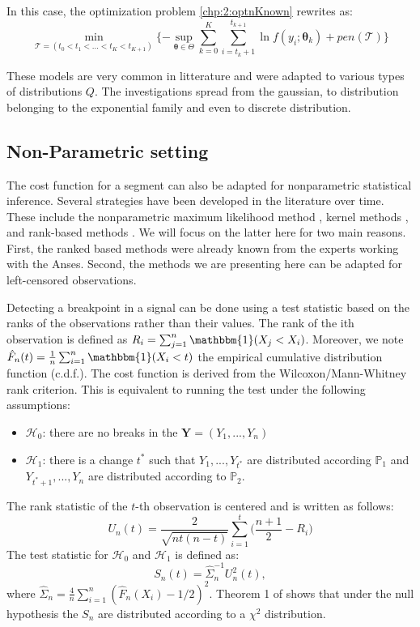 In this case, the optimization problem \ref{chp:2:optnKnown} rewrites as: 
\begin{equation}\label{chp:2:penlik}
\min_{\mathcal{T} = (t_0 < t_1 < ... < t_K < t_{K+1})} \{ -\sup_{\bm \theta \in \Theta} \sum_{k=0}^K \sum_{i = t_k+1}^{t_{k+1}} \ln f(y_i; \bm \theta_k) + pen(\mathcal{T}) \} 
\end{equation}       

These models are very common in litterature and were adapted to various types of distributions $Q$. The investigations spread from the gaussian, to distribution belonging to the exponential family and even to discrete distribution. 

\subsection{Non-Parametric setting}

The cost function for a segment can also be adapted for nonparametric statistical inference. Several strategies have been developed in the literature over time. These include the nonparametric maximum likelihood method \cite{Zou2014,Einmahl2003}, kernel methods \cite{Harchaoui2008,li2015m}, and rank-based methods \cite{Pettitt1980,Wang2019}. We will focus on the latter here for two main reasons. First, the ranked based methods were already known from the experts working with the Anses. Second, the methods we are presenting here can be adapted for left-censored observations.  

Detecting a breakpoint in a signal can be done using a test statistic based on the ranks of the observations rather than their values. The rank of the ith observation is defined as $R_i = \sum_{j =1}^n\mathbbm{1}(X_j < X_i)$. Moreover, we note $\hat{F}_n(t) = \frac{1}{n}\sum_{i = 1}^n\mathbbm{1}(X_i < t)$ the empirical cumulative distribution function (c.d.f.). The cost function is derived from the Wilcoxon/Mann-Whitney rank criterion. This is equivalent to running the test under the following assumptions: 
\begin{itemize}
  \item $\mathcal{H}_0$: there are no breaks in the $\bm Y = (Y_1,...,Y_n)$ 
  \item $\mathcal{H}_1$: there is a change $t^*$ such that $Y_1,...,Y_{t^*}$ are distributed according $\mathbb{P}_1$ and $Y_{t^*+1},...,Y_{n}$ are distributed according to $\mathbb{P}_2$. 
\end{itemize}
The rank statistic of the $t$-th observation is centered and is written as follows:
\begin{equation}\label{chp2:statranknp}
  U_n(t) = \frac{2}{\sqrt{nt(n-t)}}\sum_{i = 1}^{t}\bigg(\frac{n+1}{2} - R_i\bigg)
\end{equation}
The test statistic for $\mathcal{H}_0$ and $\mathcal{H}_1$ is defined as:
\begin{equation}\label{chp2:stattestnp}
  S_n(t) = \hat{\Sigma}_n^{-1} U^2_n(t),
\end{equation}
where $\hat{\Sigma}_n = \frac{4}{n}\sum_{i=1}^n(\hat{F}_n(X_i)-1/2)^2$. Theorem 1 of \cite{lung2015} shows that under the null hypothesis the $S_n$ are distributed according to a $\chi^2$ distribution.


